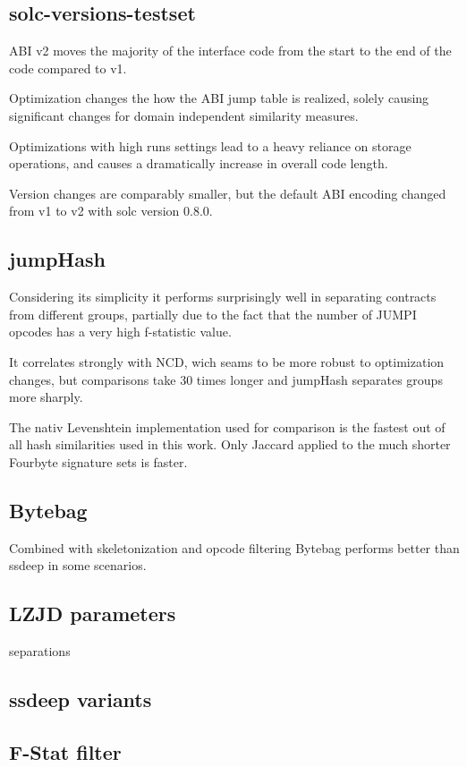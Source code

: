 \documentclass[../main.tex]{subfiles}
\begin{document}
\subsection{solc-versions-testset}
ABI v2 moves the majority of the interface code from the start to the end of the code compared to v1.

Optimization changes the how the ABI jump table is realized, solely causing significant changes for domain independent similarity measures.

Optimizations with high runs settings lead to a heavy reliance on storage operations, and causes a dramatically increase in overall code length.

Version changes are comparably smaller, but the default ABI encoding changed from v1 to v2 with solc version 0.8.0.


\subsection{jumpHash}
Considering its simplicity it performs surprisingly well in separating contracts from different groups, partially due to the fact that the number of JUMPI opcodes has a very high f-statistic value.

It correlates strongly with NCD, wich seams to be more robust to optimization changes, but comparisons take 30 times longer and jumpHash separates groups more sharply.


The nativ Levenshtein implementation used for comparison is the fastest out of all hash similarities used in this work. Only Jaccard applied to the much shorter Fourbyte signature sets is faster.


\subsection{Bytebag}
Combined with skeletonization and opcode filtering Bytebag performs better than ssdeep in some scenarios.

\subsection{LZJD parameters}


\begin{table}[ht!]
  \centering

  \caption{separations}
  \label{tbl:lz_sep}
\end{table}


\subsection{ssdeep variants}

\subsection{F-Stat filter}
\end{document}
